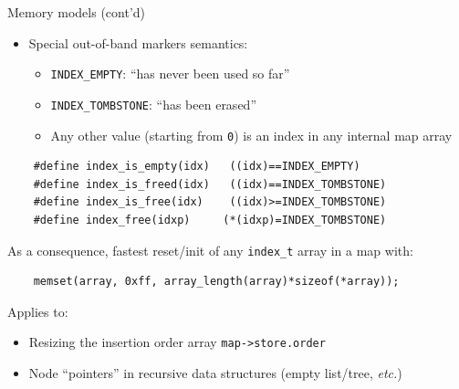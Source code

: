 \begin{frame}[fragile]{Memory models (cont'd)}

  \begin{itemize}
  \item Special out-of-band markers semantics:
    \begin{itemize}
    \item \lstinline{INDEX_EMPTY}: ``has never been used so far''
    \item \lstinline{INDEX_TOMBSTONE}: ``has been erased''
    \item Any other value (starting from \lstinline{0}) is an index in any internal map array
    \end{itemize}
  \end{itemize}

  \begin{lstlisting}
    #define index_is_empty(idx)   ((idx)==INDEX_EMPTY)
    #define index_is_freed(idx)   ((idx)==INDEX_TOMBSTONE)
    #define index_is_free(idx)    ((idx)>=INDEX_TOMBSTONE)
    #define index_free(idxp)     (*(idxp)=INDEX_TOMBSTONE)
  \end{lstlisting}

  As a consequence, fastest reset/init of any \lstinline{index_t} array in a map with:
  \begin{lstlisting}
    memset(array, 0xff, array_length(array)*sizeof(*array));
  \end{lstlisting}

  Applies to:
  \begin{itemize}
  \item Resizing the insertion order array \lstinline{map->store.order}
  \item Node ``pointers'' in recursive data structures (empty list/tree, {\em etc.})
  \end{itemize}

\end{frame}


